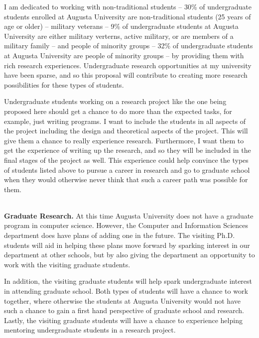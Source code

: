 \begin{full}
I am dedicated to working with non-traditional students -- 30\% of
undergraduate students enrolled at Augusta University are
non-traditional students (25 years of age or older) -- military
veterans -- 9\% of undergraduate students at Augusta
University are either military verterns, active military, or are
members of a military family -- and people of minority groups -- 32\%
of undergraduate students at Augusta University are people of
minority groups -- by providing them with rich research
experiences. Undergraduate research opportunities at my university
have been sparse, and so this proposal will contribute to creating
more research possibilities for these types of students.  %

Undergraduate students working on a research project like the one
being proposed here should get a chance to do more than the expected
tasks, for example, just writing programs.  I want to include the
students in all aspects of the project including the design and
theoretical aspects of the project.  This will give them a chance to
really experience research.  Furthermore, I want them to get the
experience of writing up the research, and so they will be included in
the final stages of the project as well.  This experience could help
convince the types of students listed above to pursue a career in
research and go to graduate school when they would otherwise never
think that such a career path was possible for them.

\ \\
\noindent
\textbf{Graduate Research.} At this time Augusta University
does not have a graduate program in computer science.  However, the
Computer and Information Sciences department does have plans of adding
one in the future.  The visiting Ph.D. students will aid in helping
these plans move forward by sparking interest in our department at
other schools, but by also giving the department an opportunity to
work with the visiting graduate students.

In addition, the visiting graduate students will help spark
undergraduate interest in attending graduate school. Both types of
students will have a chance to work together, where otherwise the
students at Augusta University would not have such a chance to
gain a first hand perspective of graduate school and research.
Lastly, the visiting graduate students will have a chance to
experience helping mentoring undergraduate students in a research
project.


\end{full}
